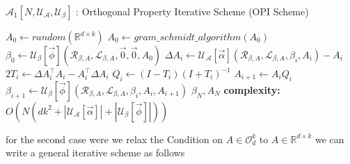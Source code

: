 \begin{algorithm}[H]
\caption{$\mathcal{A}_{1}[N,\mathcal{U_{A}},\mathcal{U_{\beta}}]$ : Orthogonal Property Iterative Scheme (OPI Scheme)}\label{lfm_orthogonal_property_iterative_scheme}
\begin{algorithmic}[1]
\State $A_{0} \gets random(\mathbb{R}^{d\times k}) $
\State $A_{0} \gets gram\_schmidt\_algorithm(A_0)$
\State $\beta_0 \gets \mathcal{U_{\beta}}[\vec{\phi}](\mathcal{R}_{\beta, A},\mathcal{L}_{\beta, A},\Vec{0},\Vec{0},A_{0})$
    \State $ \Delta A_i \gets \mathcal{U_{A}}[\vec{\alpha}](\mathcal{R}_{\beta, A},\mathcal{L}_{\beta, A},\beta_i,A_i)-A_i$
    \State $2T_i \gets \Delta A_i^\top A_i- A_i^\top \Delta A_i$
    \State $Q_i \gets (I-T_i)(I+T_i)^{-1}$
    \State $A_{i+1} \gets A_iQ_i$
    \State $\beta_{i+1} \gets \mathcal{U_{\beta}}[\vec{\phi}](\mathcal{R}_{\beta, A},\mathcal{L}_{\beta, A},\beta_{i}, A_{i}, A_{i+1})$
\EndFor
\State \Return $\beta_{N},A_{N}$
\State \textbf{complexity: } $O(N(dk^2+|\mathcal{U_{A}}[\vec{\alpha}]|+|\mathcal{U_{\beta}}[\vec{\phi}]|))$
\end{algorithmic}
\end{algorithm} for the second case were we relax the Condition on $A \in \mathcal{O}_d^k$ to $A \in \mathbb{R}^{d\times k}$ we can write a general iterative scheme as follows
